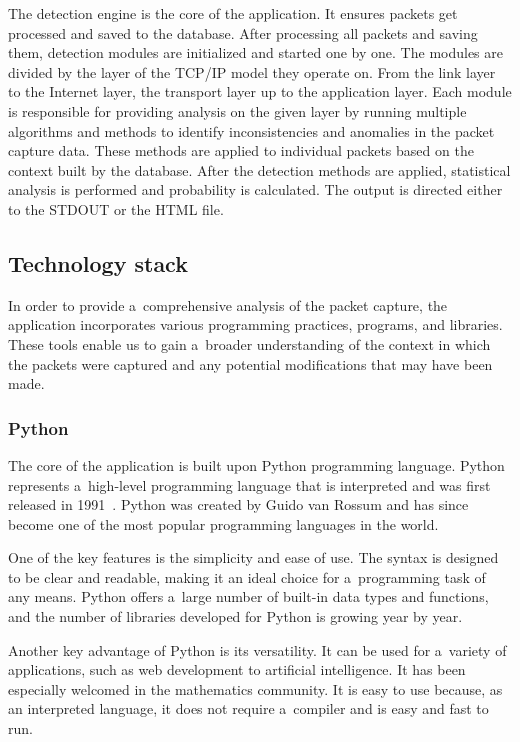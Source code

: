 \documentclass[
  printed,     %
  color,       %
  oneside,     %
  nosansbold,  %
  nocolorbold, %
  nolof,         %
  nolot,         %
]{fithesis4}
\begin{document}
The detection engine is the core of the application. It ensures packets get processed and saved to the database. After processing all packets and saving them, detection modules are initialized and started one by one. The modules are divided by the layer of the TCP/IP model they operate on. From the link layer to the Internet layer, the transport layer up to the application layer. Each module is responsible for providing analysis on the given layer by running multiple algorithms and methods to identify inconsistencies and anomalies in the packet capture data. These methods are applied to individual packets based on the context built by the database. After the detection methods are applied, statistical analysis is performed and probability is calculated. The output is directed either to the STDOUT or the HTML file.

\subsection{Technology stack}

In order to provide a~comprehensive analysis of the packet capture, the application incorporates various programming practices, programs, and libraries. These tools enable us to gain a~broader understanding of the context in which the packets were captured and any potential modifications that may have been made.


\subsubsection{Python}

The core of the application is built upon Python programming language. Python represents a~high-level programming language that is interpreted and was first released in 1991~\cite{lutz_2009}. Python was created by Guido van Rossum and has since become one of the most popular programming languages in the world.

One of the key features is the simplicity and ease of use. The syntax is designed to be clear and readable, making it an ideal choice for a~programming task of any means. Python offers a~large number of built-in data types and functions, and the number of libraries developed for Python is growing year by year.

Another key advantage of Python is its versatility. It can be used for a~variety of applications, such as web development to artificial intelligence. It has been especially welcomed in the mathematics community. It is easy to use because, as an interpreted language, it does not require a~compiler and is easy and fast to run.
\end{document}
